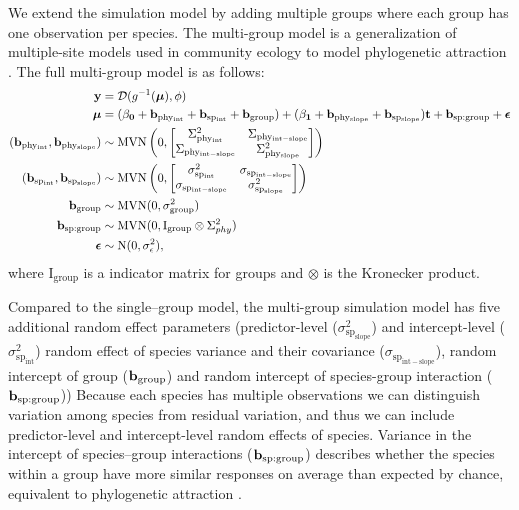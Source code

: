 \documentclass[12pt]{article}
\begin{document}
We extend the simulation model by adding multiple groups where each group has one observation per species. 
The multi-group model is a generalization of multiple-site models used in community ecology to model phylogenetic attraction \citep{helmus2007separating}. 
The full multi-group model is as follows: 
\begin{equation}
\begin{aligned}
{\mathbf y} & = {\cal D}(g^{-1}({\boldsymbol \mu}), \phi) \\
{\boldsymbol \mu} & = (\bf{\beta_0 + b_{\mathrm{phy_{int}}} + b_{\mathrm{sp_{int}}} + b_{\mathrm{group}}}) + (\bf{\beta_1 + b_{\mathrm{phy_{slope}}} + b_{\mathrm{sp_{slope}}}}) \bm{t} + \bf{b_{\mathrm{sp:group}}} + {\boldsymbol \epsilon} \\
(\bf{b_{\mathrm{phy_{int}}}, b_{\mathrm{phy_{slope}}}}) & \sim \textrm{MVN} \left( 0, \begin{bmatrix}
\Sigma^2_{\mathrm{phy_{int}}} & \Sigma_{\mathrm{phy_{int-slope}}} \\ 
\Sigma_{\mathrm{phy_{int-slope}}} & \Sigma^2_{\mathrm{phy_{slope}}}
\end{bmatrix}
\right) \\
(\bf{b_{\mathrm{sp_{int}}}, b_{\mathrm{sp_{slope}}}}) & \sim \textrm{MVN} \left( 0, \begin{bmatrix}
\sigma^2_{\mathrm{sp_{int}}} & \sigma_{\mathrm{sp_{int-slope}}} \\ 
\sigma_{\mathrm{sp_{int-slope}}} & \sigma^2_{\mathrm{sp_{slope}}}
\end{bmatrix}
\right) \\
\bf{b_{\mathrm{group}}} & \sim \textrm{MVN} ( 0 , \sigma^2_{\mathrm{group}}) \\
\bf{b_{\mathrm{sp:group}}} & \sim \textrm{MVN} (0, \mathrm{I}_{\mathrm{group}} \otimes \Sigma^2_{phy}) \\
{\boldsymbol \epsilon} & \sim \textrm{N} ( 0 , \sigma_{\epsilon}^2),
\label{eq:multiple_glmm}
\end{aligned}
\end{equation}
where $\textrm{I}_{\textrm{group}}$ is a indicator matrix for groups and $\otimes$ is the Kronecker product.

Compared to the single--group model, the multi-group simulation model has five additional random effect parameters (predictor-level ($\sigma^2_{\mathrm{sp_{slope}}}$) and intercept-level ($\sigma^2_{\mathrm{sp_{int}}}$) random effect of species variance and their covariance ($\sigma_{\mathrm{sp_{int-slope}}}$), random intercept of group ($\bf{b_{\mathrm{group}}}$) and random intercept of species-group interaction ($\bf{b_{\mathrm{sp:group}}}$))
Because each species has multiple observations we can distinguish variation among species from residual variation, and thus we can include predictor-level and intercept-level random effects of species.
Variance in the intercept of species--group interactions ($\bf{b_{\mathrm{sp:group}}}$) describes whether the species within a group have more similar responses on average than expected by chance, equivalent to phylogenetic attraction \citep{helmus2007separating}. 
\end{document}
